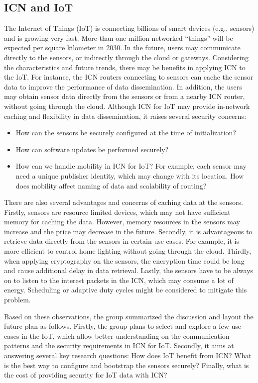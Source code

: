 \subsection{ICN and IoT}
The Internet of Things (IoT) is connecting billions of smart devices (e.g., sensors) and is growing
very fast. More than one million networked ``things'' will be expected per square kilometer in 2030.
In the future, users may communicate directly to the sensors, or indirectly through the cloud or gateways.
Considering the characteristics and future trends, there may be benefits in applying ICN to the IoT. For instance,
the ICN routers connecting to sensors can cache the sensor data to improve the performance of data
dissemination. In addition, the users may obtain sensor data directly from the sensors or from a
nearby ICN router, without going through the cloud. Although ICN for IoT may provide in-network
caching and flexibility in data dissemination, it raises several security concerns:

\begin{itemize}
\item How can the sensors be securely configured at the time of initialization?
\item How can software updates be performed securely?
\item How can we handle mobility in ICN for IoT? For example, each sensor may need a unique publisher
identity, which may change with its location. How does mobility affect naming of data and scalability of routing?
\end{itemize}

There are also several advantages and concerns of caching data at the sensors. Firstly,
sensors are resource limited devices, which may not have sufficient memory for caching the data.
However, memory resources in the sensors may increase and the
price may decrease in the future. Secondly, it is advantageous to retrieve data directly from the
sensors in certain use cases. For example, it is more efficient to control home lighting without
going through the cloud. Thirdly, when applying cryptography on  the sensors, the encryption time
could be long and cause additional delay in data retrieval. Lastly, the sensors have to be always
on to listen to the interest packets in the ICN, which may consume a lot of energy. Scheduling or
adaptive duty cycles might be considered to mitigate this problem.

Based on these observations, the group summarized the discussion and layout the future plan as
follows. Firstly, the group plans to select and explore a few use cases in the IoT, which allow
better understanding on the communication patterns and the security requirements in ICN for IoT.
Secondly, it aims at answering several key research questions: How does IoT benefit from ICN?
What is the best way to configure and bootstrap the sensors securely? Finally, what is the cost
of providing security for IoT data with ICN?

